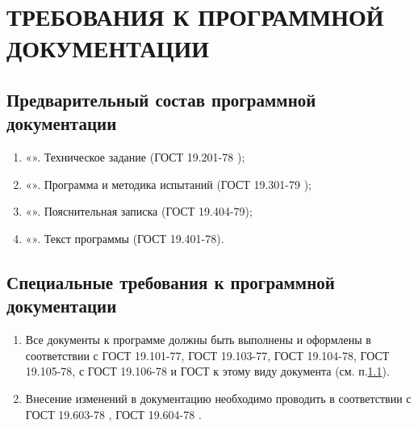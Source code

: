 \section{ТРЕБОВАНИЯ К ПРОГРАММНОЙ ДОКУМЕНТАЦИИ}

\subsection{Предварительный состав программной документации}
\label{docs.list}

\begin{enumerate}
    \item «\docTitle». Техническое задание (ГОСТ 19.201-78 \cite{gost:19.201-78});
    \item «\docTitle». Программа и методика испытаний (ГОСТ 19.301-79 \cite{gost:19.301-79});
    \item «\docTitle». Пояснительная записка (ГОСТ 19.404-79);
    \item «\docTitle». Текст программы (ГОСТ 19.401-78).

\end{enumerate}

\subsection{Специальные требования к программной документации}
\label{docs.extra}

\begin{enumerate}
    \item Все документы к программе должны быть выполнены и оформлены в соответствии с
    ГОСТ 19.101-77, ГОСТ 19.103-77, ГОСТ 19.104-78, ГОСТ 19.105-78, с ГОСТ 19.106-78 и ГОСТ к этому виду документа (см. п.\ref{docs.list}).
    \item Внесение изменений в документацию необходимо проводить в соответствии с ГОСТ 19.603-78 \cite{gost:19.603-78}, ГОСТ 19.604-78 \cite{gost:19.604-78}.
\end{enumerate}

\clearpage

